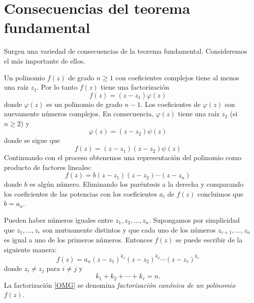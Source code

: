 \section{Consecuencias del teorema fundamental}

Surgen una variedad de consecuencias de la teorema fundamental. Consideremos el más importante de ellos.

Un polinomio $f(z)$ de grado $n \geq 1$ con coeficientes complejos tiene al menos una raíz $z_1$. Por lo tanto $f(z)$ tiene una factorización
$$f(z)=(z-z_1) \varphi (z)$$
donde $\varphi(z)$ es un polinomio de grado $n - 1$. Los coeficientes de $\varphi(z)$ son nuevamente números complejos. En consecuencia, $\varphi(z)$ tiene una raíz $z_2$ (si $n \geq 2$) y
$$\varphi (z) = (z-z_2) \psi (z)$$
donde se sigue que
$$f(z) = (z-z_1)(z-z_2) \psi (z)$$
Continuando con el proceso obtenemos una representación del polinomio como producto de factores lineales:
$$f(z) = b (z-z_1)(z-z_2) \cdots (z-z_n)$$
donde $b$ es algún número. Eliminando los paréntesis a la derecha y comparando los coeficientes de las potencias con los coeficientes $a_i$ de $f(z)$ concluimos que $b = a_n$.

Pueden haber números iguales entre $z_1,  z_2,  \dots ,  z_n$. Supongamos por simplicidad que $z_1,  \dots,  z_r$ son mutuamente distintos y que cada uno de los números $z_{r+1},  \dots,  z_n$ es igual a uno de los primeros números. Entonces $f(z)$ se puede escribir de la siguiente manera:
\begin{equation}
    f(z)=a_n (z-z_1)^{k_1}(z-z_2)^{k_2} \cdots (z-z_r)^{k_r} \label{OMG}
\end{equation}
donde $z_i \neq z_j$ para $i \neq j$ y
$$k_1+k_2+\cdots +k_r=n.$$
La factorización \eqref{OMG} se denomina \textit{factorización canónica de un polinomio} $f(z)$.

